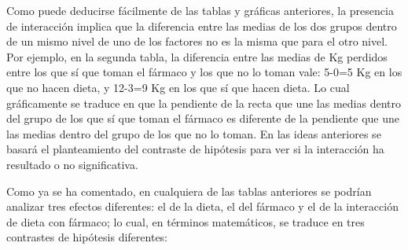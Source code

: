 \documentclass[
  spanish,
  a4paper,
]{scrreport}
\theoremstyle{plain}
\theoremstyle{definition}
\theoremstyle{definition}
\theoremstyle{remark}
\begin{document}
Como puede deducirse fácilmente de las tablas y gráficas anteriores, la
presencia de interacción implica que la diferencia entre las medias de
los dos grupos dentro de un mismo nivel de uno de los factores no es la
misma que para el otro nivel. Por ejemplo, en la segunda tabla, la
diferencia entre las medias de Kg perdidos entre los que sí que toman el
fármaco y los que no lo toman vale: 5-0=5 Kg en los que no hacen dieta,
y 12-3=9 Kg en los que sí que hacen dieta. Lo cual gráficamente se
traduce en que la pendiente de la recta que une las medias dentro del
grupo de los que sí que toman el fármaco es diferente de la pendiente
que une las medias dentro del grupo de los que no lo toman. En las ideas
anteriores se basará el planteamiento del contraste de hipótesis para
ver si la interacción ha resultado o no significativa.

Como ya se ha comentado, en cualquiera de las tablas anteriores se
podrían analizar tres efectos diferentes: el de la dieta, el del fármaco
y el de la interacción de dieta con fármaco; lo cual, en términos
matemáticos, se traduce en tres contrastes de hipótesis diferentes:
\end{document}
